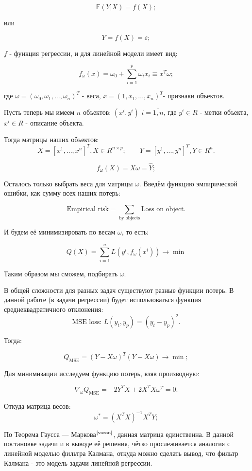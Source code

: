 \documentclass[a4paper,11pt]{article} %
\begin{document}
$$\mathds{E}(Y|X)=f(X);$$

или

$$Y=f(X)=\varepsilon;$$

$f$ - функция регрессии, и для линейной модели имеет вид:

$$f_\omega(x)=\omega_0+\sum\limits_{i=1}^p\omega_ix_i\equiv x^T\omega;$$

где $\omega=(\omega_0,\omega_1,...,\omega_n)^T$ - веса, $x=(1,x_1,...,x_n)^T$- признаки объектов. 

Пусть теперь мы имеем  $n$ объектов: $(x^i,y^i)$ $i=\overline{1,n}$,  где $y^i\in R$ - метки  объекта,   $x^i\in R$ - описание  объекта.

Тогда матрицы  наших  объектов: $$X=[x^1,...,x^n]^T, X\in  R^{n\times p};\qquad Y=[y^1,...,y^n]^T, Y\in  R^{n}.$$

 \begin{equation}\label{Xw}
f_\omega(X)=X\omega=\widehat{Y};
\end{equation}
 
 Осталось только выбрать веса для  матрицы $\omega$. Введём функцию эмпирической ошибки,  как сумму всех наших потерь:
 
 $$\text{Empirical risk}=\sum\limits_\text{by objects}\text{Loss on object}.$$
 
И будем её минимизировать по весам $\omega$,  то есть:

$$Q(X)=\sum\limits_{i=1}^{n}L(y^i,f_\omega(x^i))\longrightarrow\min$$

 Таким образом мы сможем,  подбирать $\omega$. 
 
 В общей сложности для разных задач  существуют разные функции потерь. В данной работе (в задачи регрессии) будет использоваться функция среднеквадратичного  отклонения:
 \begin{equation}\label{MSE}
\text{MSE loss: } L(y_t,y_p)=(y_t-y_p)^2.
\end{equation}
 
Тогда:

$$Q_\text{MSE}=(Y-X\omega)^T(Y-X\omega)\longrightarrow\min;$$

Для минимизации исследуем функцию потерь,  взяв производную:

$$\nabla_\omega Q_\text{MSE}=-2Y^TX+2X^TX\omega^T=0.$$

Откуда матрица весов:
\begin{equation}\label{w}
\omega^*=(X^TX)^{-1}X^TY;
\end{equation}

По  Теорема Гаусса — Маркова$^\text{\cite{voron}}$,  данная матрица единственна.  В данной постановке задачи и в выводе её решения,  чётко прослеживается аналогия с линейной  моделью фильтра  Калмана,  откуда можно сделать вывод, что фильтр Калмана - это модель  задачи линейной  регрессии.
\end{document}
